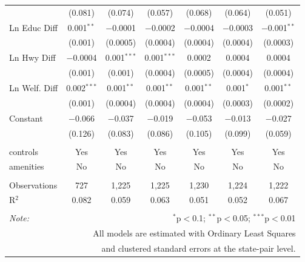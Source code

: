 \begin{table}[!htbp]
\begin{tabular}{@{\extracolsep{5pt}}lcccccc}
  & (0.081) & (0.074) & (0.057) & (0.068) & (0.064) & (0.051) \\ 
  Ln Educ Diff & 0.001$^{**}$ & $-$0.0001 & $-$0.0002 & $-$0.0004 & $-$0.0003 & $-$0.001$^{**}$ \\ 
  & (0.001) & (0.0005) & (0.0004) & (0.0004) & (0.0004) & (0.0003) \\ 
  Ln Hwy Diff & $-$0.0004 & 0.001$^{***}$ & 0.001$^{***}$ & 0.0002 & 0.0004 & 0.0004 \\ 
  & (0.001) & (0.001) & (0.0004) & (0.0005) & (0.0004) & (0.0004) \\ 
  Ln Welf. Diff & 0.002$^{***}$ & 0.001$^{**}$ & 0.001$^{**}$ & 0.001$^{**}$ & 0.001$^{*}$ & 0.001$^{**}$ \\ 
  & (0.001) & (0.0004) & (0.0004) & (0.0004) & (0.0003) & (0.0002) \\ 
  Constant & $-$0.066 & $-$0.037 & $-$0.019 & $-$0.053 & $-$0.013 & $-$0.027 \\ 
  & (0.126) & (0.083) & (0.086) & (0.105) & (0.099) & (0.059) \\ 
 \hline \\[-1.8ex] 
controls & Yes & Yes & Yes & Yes & Yes & Yes \\ 
amenities & No & No & No & No & No & No \\ 
\hline \\[-1.8ex] 
Observations & 727 & 1,225 & 1,225 & 1,230 & 1,224 & 1,222 \\ 
R$^{2}$ & 0.082 & 0.059 & 0.063 & 0.051 & 0.052 & 0.067 \\ 
\hline 
\hline \\[-1.8ex] 
\textit{Note:}  & \multicolumn{6}{r}{$^{*}$p$<$0.1; $^{**}$p$<$0.05; $^{***}$p$<$0.01} \\ 
 & \multicolumn{6}{r}{All models are estimated with Ordinary Least Squares} \\ 
 & \multicolumn{6}{r}{and clustered standard errors at the state-pair level.} \\ 
\end{tabular} 
\end{table} 
